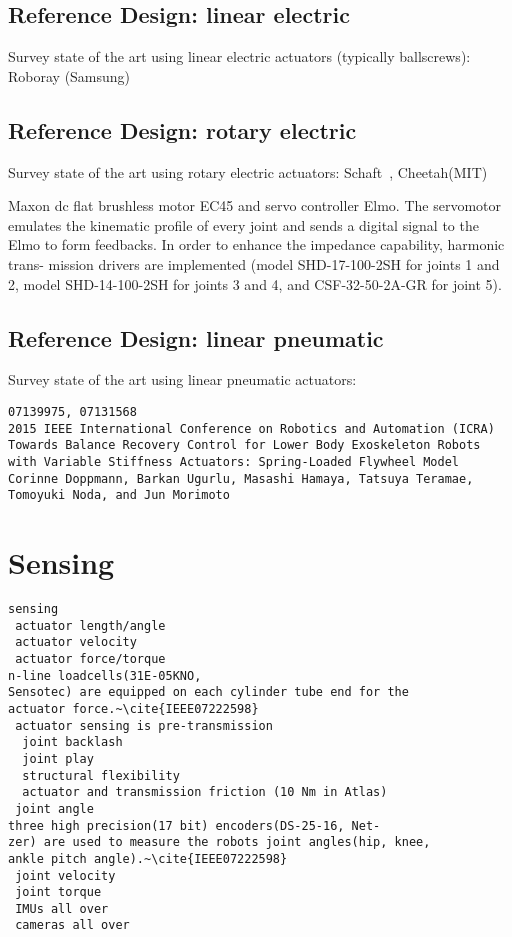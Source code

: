 \documentclass[letterpaper,12pt,fullpage]{article}
\begin{document}
\subsection{Reference Design: linear electric}

Survey state of the art using linear electric actuators (typically ballscrews):
Roboray (Samsung)

\subsection{Reference Design: rotary electric}

Survey state of the art using rotary electric actuators:
Schaft~\cite{shaft_foot_placement,shaft_push_recov}, Cheetah(MIT)

Maxon dc flat brushless motor EC45 and servo controller
Elmo. The servomotor emulates the kinematic profile of every
joint and sends a digital signal to the Elmo to form feedbacks.
In order to enhance the impedance capability, harmonic trans-
mission drivers are implemented (model SHD-17-100-2SH
for joints 1 and 2, model SHD-14-100-2SH for joints 3 and 4,
and CSF-32-50-2A-GR for joint 5).~\cite{IEEE07128705}

\subsection{Reference Design: linear pneumatic}

Survey state of the art using linear pneumatic actuators:

\begin{verbatim}
07139975, 07131568
2015 IEEE International Conference on Robotics and Automation (ICRA)
Towards Balance Recovery Control for Lower Body Exoskeleton Robots
with Variable Stiffness Actuators: Spring-Loaded Flywheel Model
Corinne Doppmann, Barkan Ugurlu, Masashi Hamaya, Tatsuya Teramae,
Tomoyuki Noda, and Jun Morimoto
\end{verbatim}

\section{Sensing}

\begin{verbatim}
sensing
 actuator length/angle
 actuator velocity
 actuator force/torque 
n-line loadcells(31E-05KNO,
Sensotec) are equipped on each cylinder tube end for the
actuator force.~\cite{IEEE07222598}
 actuator sensing is pre-transmission
  joint backlash
  joint play
  structural flexibility
  actuator and transmission friction (10 Nm in Atlas)
 joint angle
three high precision(17 bit) encoders(DS-25-16, Net-
zer) are used to measure the robots joint angles(hip, knee,
ankle pitch angle).~\cite{IEEE07222598}
 joint velocity
 joint torque
 IMUs all over
 cameras all over
\end{verbatim}
\end{document}
